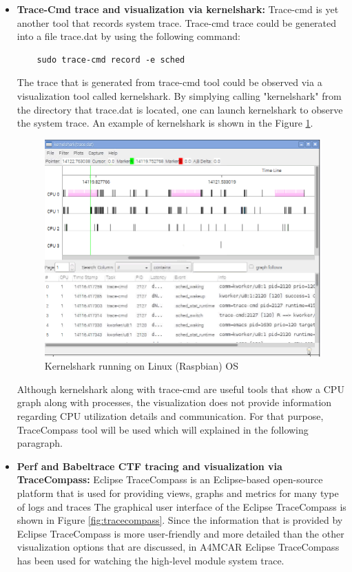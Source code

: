 \begin{itemize}
	\item \textbf{Trace-Cmd trace and visualization via kernelshark:}
	Trace-cmd \cite{tracecmd} is yet another tool that records system trace. Trace-cmd trace could be generated into a file trace.dat by using the following command:
	\begin{lstlisting}
	sudo trace-cmd record -e sched
	\end{lstlisting}
	The trace that is generated from trace-cmd tool could be observed via a visualization tool called kernelshark. By simplying calling "kernelshark" from the directory that trace.dat is located, one can launch kernelshark to observe the system trace. An example of kernelshark is shown in the Figure \ref{fig:kernelshark}.
	\begin{figure}[!ht]
		\centering
		\includegraphics[scale=0.5]{content/images/kernelshark.png}
		\caption{Kernelshark running on Linux (Raspbian) OS}
		\label{fig:kernelshark}
	\end{figure}
	Although kernelshark along with trace-cmd are useful tools that show a CPU graph along with processes, the visualization does not provide information regarding CPU utilization details and communication. For that purpose, TraceCompass tool will be used which will explained in the following paragraph. 
	\item \textbf{Perf and Babeltrace CTF tracing and visualization via TraceCompass:} 	Eclipse TraceCompass \cite{tracecompass} is an Eclipse-based open-source platform that is used for providing views, graphs and metrics for many type of logs and traces \cite{tracecompass} The graphical user interface of the Eclipse TraceCompass is shown in Figure \ref{fig:tracecompass}. Since the information that is provided by Eclipse TraceCompass is more user-friendly and more detailed than the other visualization options that are discussed, in A4MCAR Eclipse TraceCompass has been used for watching the high-level module system trace.
	

\end{itemize}
